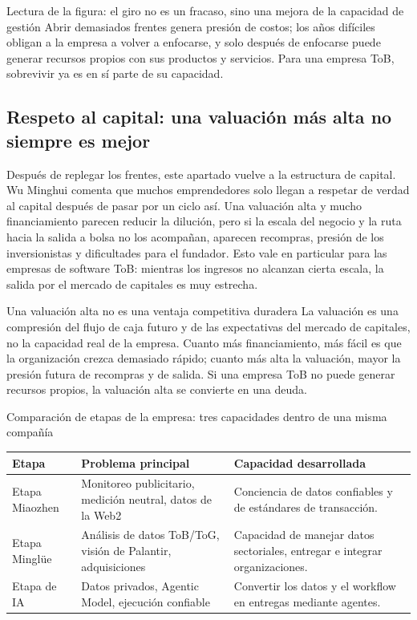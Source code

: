 \begin{knowledgebox}{Lectura de la figura: el giro no es un fracaso, sino una mejora de la capacidad de gestión}
Abrir demasiados frentes genera presión de costos; los años difíciles obligan a la empresa a volver a enfocarse, y solo después de enfocarse puede generar recursos propios con sus productos y servicios. Para una empresa ToB, sobrevivir ya es en sí parte de su capacidad.
\end{knowledgebox}

\subsection{Respeto al capital: una valuación más alta no siempre es mejor}

Después de replegar los frentes, este apartado vuelve a la estructura de capital. Wu Minghui comenta que muchos emprendedores solo llegan a respetar de verdad al capital después de pasar por un ciclo así. Una valuación alta y mucho financiamiento parecen reducir la dilución, pero si la escala del negocio y la ruta hacia la salida a bolsa no los acompañan, aparecen recompras, presión de los inversionistas y dificultades para el fundador. Esto vale en particular para las empresas de software ToB: mientras los ingresos no alcanzan cierta escala, la salida por el mercado de capitales es muy estrecha.

\begin{warningbox}{Una valuación alta no es una ventaja competitiva duradera}
La valuación es una compresión del flujo de caja futuro y de las expectativas del mercado de capitales, no la capacidad real de la empresa. Cuanto más financiamiento, más fácil es que la organización crezca demasiado rápido; cuanto más alta la valuación, mayor la presión futura de recompras y de salida. Si una empresa ToB no puede generar recursos propios, la valuación alta se convierte en una deuda.
\end{warningbox}

\begin{knowledgebox}{Comparación de etapas de la empresa: tres capacidades dentro de una misma compañía}
\begin{tabularx}{\textwidth}{p{}p{}X}
\toprule
Etapa & Problema principal & Capacidad desarrollada \\
\midrule
Etapa Miaozhen & Monitoreo publicitario, medición neutral, datos de la Web2 & Conciencia de datos confiables y de estándares de transacción. \\
Etapa Minglüe & Análisis de datos ToB/ToG, visión de Palantir, adquisiciones & Capacidad de manejar datos sectoriales, entregar e integrar organizaciones. \\
Etapa de IA & Datos privados, Agentic Model, ejecución confiable & Convertir los datos y el workflow en entregas mediante agentes. \\
\bottomrule
\end{tabularx}
\end{knowledgebox}

